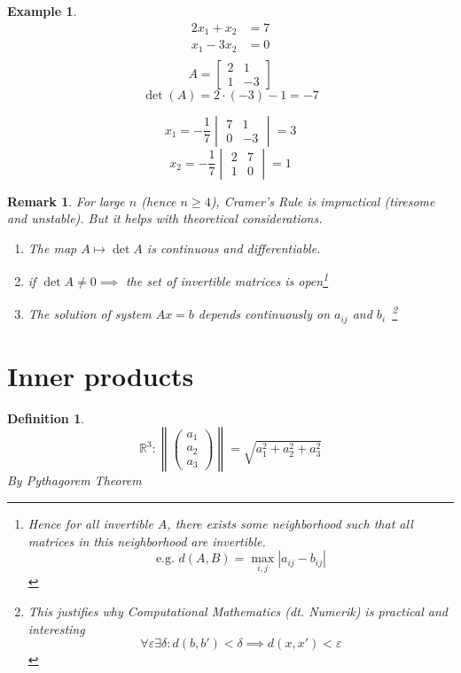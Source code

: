 \documentclass{article}
\newtheorem{example}{Example}  \numberwithin{example}{section}
\newtheorem{definition}{Definition}  \numberwithin{definition}{section}
\newtheorem{remark}{Remark}  \numberwithin{remark}{section}
\newcommand{\norm}[1]{\left\|#1\right\|}
\newcommand{\card}[1]{\left|#1\right|}
\begin{document}
\begin{example}
  \begin{align*}
    2x_1 + x_2 &= 7 \\
    x_1 - 3x_2 &= 0 \\
  \end{align*}%
%
  \[ A = \begin{bmatrix} 2 & 1 \\ 1 & -3 \end{bmatrix} \]
  \[ \det(A) = 2 \cdot (-3) - 1 = -7 \]

  \[ x_1 = -\frac17 \begin{vmatrix} 7 & 1 \\ 0 & -3 \end{vmatrix} = 3 \]
  \[ x_2 = -\frac17 \begin{vmatrix} 2 & 7 \\ 1 & 0 \end{vmatrix} = 1 \]
\end{example}

\begin{remark}
  For large $n$ (hence $n \geq 4$), Cramer's Rule is impractical (tiresome and unstable).
  But it helps with theoretical considerations.
  \begin{enumerate}
    \item The map $A \mapsto \det{A}$ is continuous and differentiable.
    \item if $\det{A} \neq 0 \implies$ the set of invertible matrices is open\footnote{Hence for all invertible $A$, there exists some neighborhood such that all matrices in this neighborhood are invertible. \[ \text{e.g. } d(A, B) = \max_{i,j} \card{a_{ij} - b_{ij}} \]}
    \item The solution of system $Ax = b$ depends continuously on $a_{ij}$ and $b_i$~\footnote{
      This justifies why Computational Mathematics (dt. \foreignlanguage{german}{Numerik}) is practical and interesting
      \[ \forall \varepsilon \exists \delta: d(b, b') < \delta \implies d(x, x') < \varepsilon \]
    }
  \end{enumerate}
\end{remark}

\section{Inner products}

\begin{definition} %
  \[ \mathbb R^3: \norm{\begin{pmatrix} a_1 \\ a_2 \\ a_3 \end{pmatrix}} = \sqrt{a_1^2 + a_2^2 + a_3^2} \]
  By Pythagorem Theorem
\end{definition}
\end{document}

